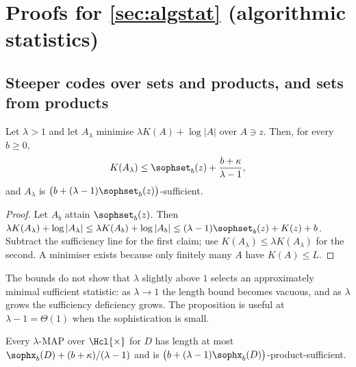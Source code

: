 \section{Proofs for \texorpdfstring{\cref{sec:algstat}}{Section \ref*{sec:algstat}} (algorithmic statistics)}\label{app:algstat}

\subsection{Steeper codes over sets and products, and sets from products}\label{app:algstat:coarse}

\begin{proposition}\label{prop:algstat:set}
Let $\lambda>1$ and let $A_\lambda$ minimise $\lambda K(A)+\log|A|$ over $A\ni z$. Then, for every $b\ge0$,
\[
K(A_\lambda)\le\sophset_b(z)+\frac{b+\kappa}{\lambda-1},
\]
and $A_\lambda$ is $\big(b+(\lambda-1)\sophset_b(z)\big)$-sufficient.
\end{proposition}

\begin{proof}
Let $A_b$ attain $\sophset_b(z)$. Then $\lambda K(A_\lambda)+\log|A_\lambda|\le\lambda K(A_b)+\log|A_b|\le(\lambda-1)\sophset_b(z)+K(z)+b$. Subtract the sufficiency line for the first claim; use $K(A_\lambda)\le\lambda K(A_\lambda)$ for the second. A minimiser exists because only finitely many $A$ have $K(A)\le L$.
\end{proof}

\begin{remark}\label{rem:algstat:near1}
The bounds do not show that $\lambda$ slightly above $1$ selects an approximately minimal sufficient statistic: as $\lambda\to1$ the length bound becomes vacuous, and as $\lambda$ grows the sufficiency deficiency grows. The proposition is useful at $\lambda-1=\Theta(1)$ when the sophistication is small.
\end{remark}

\begin{proposition}\label{prop:algstat:product}
Every $\lambda$-MAP over $\Hcl{\times}$ for $D$ has length at most $\sophx_b(D)+(b+\kappa)/(\lambda-1)$ and is $\big(b+(\lambda-1)\sophx_b(D)\big)$-product-sufficient.
\end{proposition}

